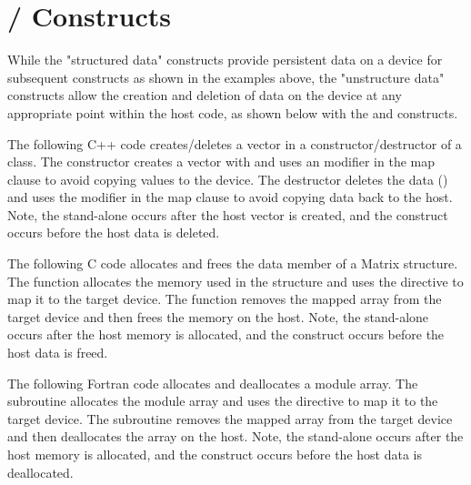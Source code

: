 \pagebreak
\section{ /  Constructs}
\label{sec:target_enter_exit_data}
While the "structured data" constructs provide persistent data on a 
device for subsequent  constructs as shown in the 
 examples above, the "unstructure data" constructs 
allow the creation and deletion of data on the device at any appropriate
point within the host code, as shown below with the  
and  constructs.

The following C++ code creates/deletes a vector in a constructor/destructor 
of a class. The constructor creates a vector with 
and uses an  modifier in the map clause to avoid copying values
to the device. The destructor deletes the data ()
and uses the  modifier in the map clause to avoid copying data
back to the host. Note, the stand-alone  occurs 
after the host vector is created, and the 
construct occurs before the host data is deleted.

The following C code allocates and frees the data member of a Matrix structure.
The  function allocates the memory used in the structure and
uses the  directive to map it to the target device. The
 function removes the mapped array from the target device
and then frees the memory on the host.  Note, the stand-alone  occurs after the host memory is allocated, and the  construct occurs before the host data is freed.

The following Fortran code allocates and deallocates a module array.  The
 subroutine allocates the module array and uses the
 directive to map it to the target device. The
 subroutine removes the mapped array from the target device and
then deallocates the array on the host.  Note, the stand-alone  occurs after the host memory is allocated, and the  construct occurs before the host data is deallocated.


